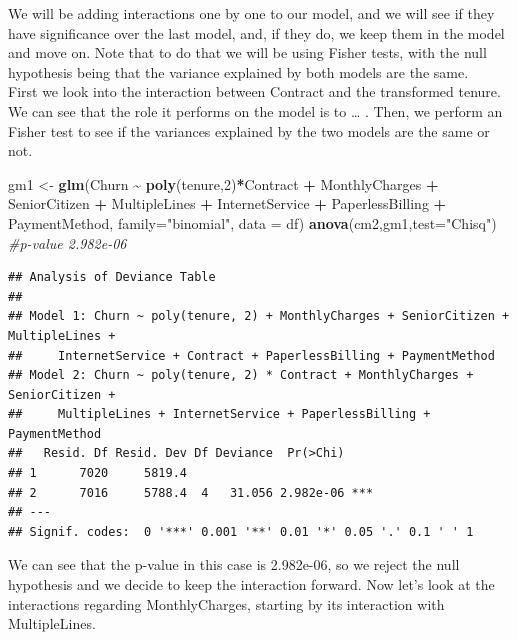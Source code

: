 \documentclass[
]{article}
\newenvironment{Shaded}{\begin{snugshade}}{\end{snugshade}}
\newcommand{\AttributeTok}[1]{\textcolor[rgb]{0.13,0.29,0.53}{#1}}
\newcommand{\CommentTok}[1]{\textcolor[rgb]{0.56,0.35,0.01}{\textit{#1}}}
\newcommand{\DecValTok}[1]{\textcolor[rgb]{0.00,0.00,0.81}{#1}}
\newcommand{\FunctionTok}[1]{\textcolor[rgb]{0.13,0.29,0.53}{\textbf{#1}}}
\newcommand{\NormalTok}[1]{#1}
\newcommand{\OtherTok}[1]{\textcolor[rgb]{0.56,0.35,0.01}{#1}}
\newcommand{\SpecialCharTok}[1]{\textcolor[rgb]{0.81,0.36,0.00}{\textbf{#1}}}
\newcommand{\StringTok}[1]{\textcolor[rgb]{0.31,0.60,0.02}{#1}}
\begin{document}
We will be adding interactions one by one to our model, and we will see
if they have significance over the last model, and, if they do, we keep
them in the model and move on. Note that to do that we will be using
Fisher tests, with the null hypothesis being that the variance explained
by both models are the same.\\
First we look into the interaction between Contract and the transformed
tenure. We can see that the role it performs on the model is to \ldots{}
. Then, we perform an Fisher test to see if the variances explained by
the two models are the same or not.

\begin{Shaded}
\begin{Highlighting}[]
\NormalTok{gm1 }\OtherTok{\textless{}{-}} \FunctionTok{glm}\NormalTok{(Churn }\SpecialCharTok{\textasciitilde{}} \FunctionTok{poly}\NormalTok{(tenure,}\DecValTok{2}\NormalTok{)}\SpecialCharTok{*}\NormalTok{Contract }\SpecialCharTok{+}\NormalTok{ MonthlyCharges }\SpecialCharTok{+}\NormalTok{ SeniorCitizen }\SpecialCharTok{+}\NormalTok{ MultipleLines }\SpecialCharTok{+}\NormalTok{ InternetService }\SpecialCharTok{+}\NormalTok{ PaperlessBilling }\SpecialCharTok{+}\NormalTok{ PaymentMethod, }\AttributeTok{family=}\StringTok{"binomial"}\NormalTok{, }\AttributeTok{data =}\NormalTok{ df)}
\FunctionTok{anova}\NormalTok{(cm2,gm1,}\AttributeTok{test=}\StringTok{"Chisq"}\NormalTok{) }\CommentTok{\#p{-}value 2.982e{-}06}
\end{Highlighting}
\end{Shaded}

\begin{verbatim}
## Analysis of Deviance Table
## 
## Model 1: Churn ~ poly(tenure, 2) + MonthlyCharges + SeniorCitizen + MultipleLines + 
##     InternetService + Contract + PaperlessBilling + PaymentMethod
## Model 2: Churn ~ poly(tenure, 2) * Contract + MonthlyCharges + SeniorCitizen + 
##     MultipleLines + InternetService + PaperlessBilling + PaymentMethod
##   Resid. Df Resid. Dev Df Deviance  Pr(>Chi)    
## 1      7020     5819.4                          
## 2      7016     5788.4  4   31.056 2.982e-06 ***
## ---
## Signif. codes:  0 '***' 0.001 '**' 0.01 '*' 0.05 '.' 0.1 ' ' 1
\end{verbatim}

We can see that the p-value in this case is 2.982e-06, so we reject the
null hypothesis and we decide to keep the interaction forward. Now let's
look at the interactions regarding MonthlyCharges, starting by its
interaction with MultipleLines.
\end{document}
